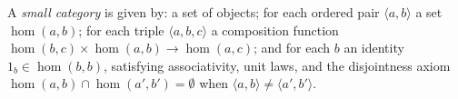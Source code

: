 A \emph{small category} is given by: a set of objects; for each ordered pair $\langle a, b \rangle$ a set $\hom(a, b)$; for each triple $\langle a, b, c \rangle$ a composition function $\hom(b, c) \times \hom(a, b) \to \hom(a, c)$; and for each $b$ an identity $1_b \in \hom(b, b)$, satisfying associativity, unit laws, and the disjointness axiom $\hom(a, b) \cap \hom(a', b') = \emptyset$ when $\langle a, b \rangle \neq \langle a', b' \rangle$.
